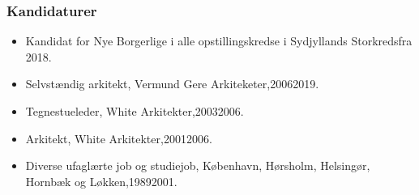 \documentclass[11pt, a4paper]{awesome-cv}
\begin{document}
\begin{cvletter}
\subsubsection*{Kandidaturer}
\begin{itemize}
\item Kandidat for Nye Borgerlige i alle opstillingskredse i Sydjyllands Storkredsfra 2018.
\end{itemize}
\begin{itemize}
\item Selvstændig arkitekt, Vermund Gere Arkiteketer,20062019.
\item Tegnestueleder, White Arkitekter,20032006.
\item Arkitekt, White Arkitekter,20012006.
\item Diverse ufaglærte job og studiejob, København, Hørsholm, Helsingør, Hornbæk og Løkken,19892001.
\end{itemize}
\end{cvletter}
\end{document}
